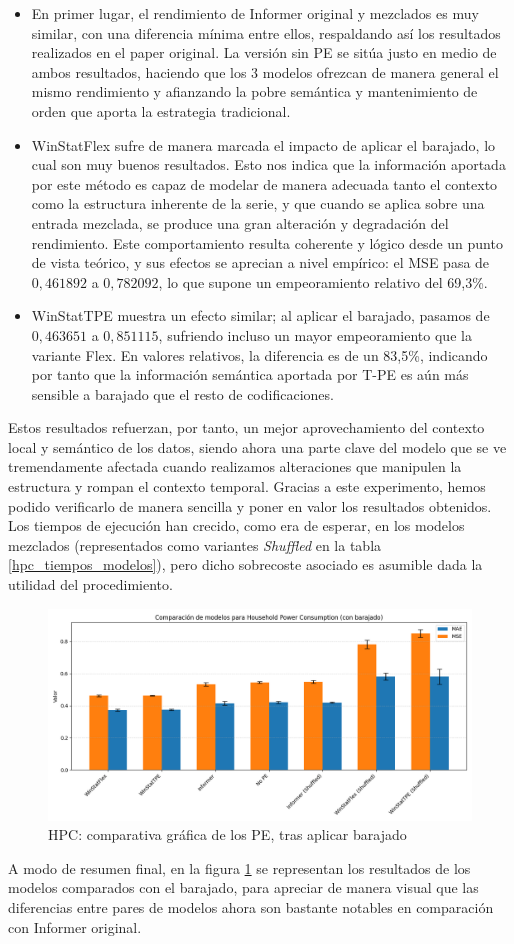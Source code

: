\begin{itemize}
	\item En primer lugar, el rendimiento de Informer original y mezclados es muy similar, con una diferencia mínima entre ellos, respaldando así los resultados realizados en el paper original. La versión sin PE se sitúa justo en medio de ambos resultados, haciendo que los 3 modelos ofrezcan de manera general el mismo rendimiento y afianzando la pobre semántica y mantenimiento de orden que aporta la estrategia tradicional.
	\item WinStatFlex sufre de manera marcada el impacto de aplicar el barajado, lo cual son muy buenos resultados. Esto nos indica que la información aportada por este método es capaz de modelar de manera adecuada tanto el contexto como la estructura inherente de la serie, y que cuando se aplica sobre una entrada mezclada, se produce una gran alteración y degradación del rendimiento. Este comportamiento resulta coherente y lógico desde un punto de vista teórico, y sus efectos se aprecian a nivel empírico: el MSE pasa de $0,461892$ a $0,782092$, lo que supone un empeoramiento relativo del 69,3\%.
	\item WinStatTPE muestra un efecto similar; al aplicar el barajado, pasamos de $0,463651$ a $0,851115$, sufriendo incluso un mayor empeoramiento que la variante Flex. En valores relativos, la diferencia es de un 83,5\%, indicando por tanto que la información semántica aportada por T-PE es aún más sensible a barajado que el resto de codificaciones.
\end{itemize}

Estos resultados refuerzan, por tanto, un mejor aprovechamiento del contexto local y semántico de los datos, siendo ahora una parte clave del modelo que se ve tremendamente afectada cuando realizamos alteraciones que manipulen la estructura y rompan el contexto temporal. Gracias a este experimento, hemos podido verificarlo de manera sencilla y poner en valor los resultados obtenidos. Los tiempos de ejecución han crecido, como era de esperar, en los modelos mezclados (representados como variantes \textit{Shuffled} en la tabla \ref{hpc_tiempos_modelos}), pero dicho sobrecoste asociado es asumible dada la utilidad del procedimiento.\\

\begin{figure}[!ht]
	\centering
	\includegraphics[scale=0.475]{img/hpcgraphshuffled}
	\caption{HPC: comparativa gráfica de los PE, tras aplicar barajado}
	\label{hpcgraphshuffled}
\end{figure}

A modo de resumen final, en la figura \ref{hpcgraphshuffled} se representan los resultados de los modelos comparados con el barajado, para apreciar de manera visual que las diferencias entre pares de modelos ahora son bastante notables en comparación con Informer original.